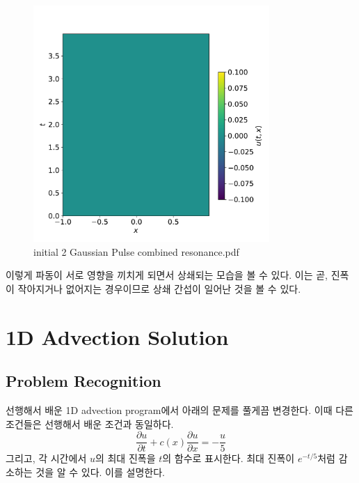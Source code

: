 \documentclass[11pt]{article}
\begin{document}
\begin{figure}[!ht]
  \centering
  \includegraphics[width=0.8\textwidth]{1d_Wave_Solution2_combined2.pdf}
  \caption{initial 2 Gaussian Pulse combined resonance.pdf}
\end{figure}
이렇게 파동이 서로 영향을 끼치게 되면서 상쇄되는 모습을 볼 수 있다. 이는 곧, 진폭이 작아지거나 없어지는 경우이므로 상쇄 간섭이 일어난 것을 볼 수 있다.
\pagebreak









\section{1D Advection Solution}
\subsection{Problem Recognition} 
선행해서 배운 1D advection program에서 아래의 문제를 풀게끔 변경한다. 이때 다른 조건들은 선행해서 배운 조건과 동일하다.
\begin{equation}
\frac{\partial u}{\partial t} + c(x) \frac{\partial u}{\partial x} = -\frac{u}{5}
\end{equation}
그리고, 각 시간에서 $u$의 최대 진폭을 $t$의 함수로 표시한다. 최대 진폭이 $e^{-t/5}$처럼 감소하는 것을 알 수 있다. 이를 설명한다.
\end{document}
